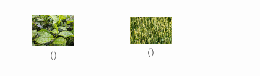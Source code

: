 \documentclass{BachelorBUI}
\begin{document}
\begin{figure}[!h]
\begin{tabular}{ccc}
\begin{subfigure}{0.30\textwidth}
                    \includegraphics[width=\textwidth]{4_artificial_background.jpg}
                    \caption{\centering (\cite{4_artificial_background:2023})}
                \end{subfigure} &
                \begin{subfigure}{0.30\textwidth}
                    \centering
                    \includegraphics[width=\textwidth]{5_artificial_background.jpg}
                    \caption{\centering (\cite{5_artificial_background:2022})}
                \end{subfigure} &
                \begin{subfigure}{0.30\textwidth}
                    \centering

\end{subfigure}
\end{tabular}
\end{figure}
\end{document}
